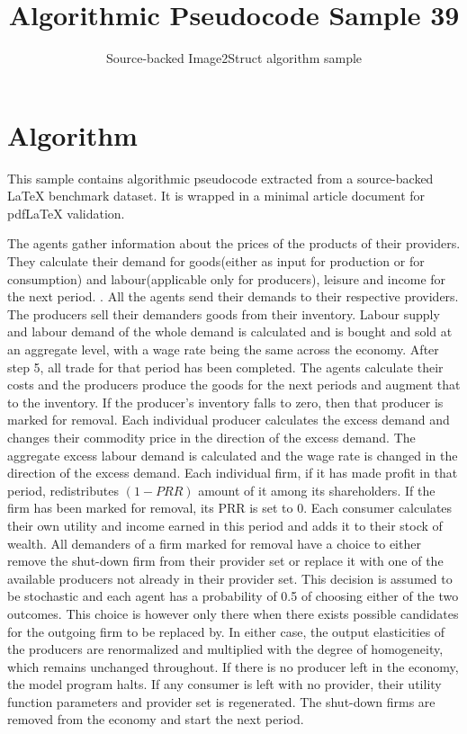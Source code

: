 \documentclass[11pt]{article}
\title{Algorithmic Pseudocode Sample 39}
\author{Source-backed Image2Struct algorithm sample}
\date{}
\begin{document}
\maketitle
\section{Algorithm}
This sample contains algorithmic pseudocode extracted from a source-backed LaTeX benchmark dataset. It is wrapped in a minimal article document for pdfLaTeX validation.

\begin{algorithm}[htbp]
\caption{Source-backed algorithmic procedure}
\begin{algorithm}
\caption{Agent action procedure for each period}\begin{algorithmic}[1]
\State The agents gather information about the prices of the products of their providers.
\State They calculate their demand for goods(either as input for production or for consumption) and labour(applicable only for producers), leisure and income for the next period. .
\State All the agents send their demands to their respective providers.
\State The producers sell their demanders goods from their inventory.
\State Labour supply and labour demand of the whole demand is calculated and is bought and sold at an aggregate level, with a wage rate being the same across the economy.
\State After step 5, all trade for that period has been completed. The agents calculate their costs and the producers produce the goods for the next periods and augment that to the inventory. If the producer's inventory falls to zero, then that producer is marked for removal.
\State Each individual producer calculates the excess demand and changes their commodity price in the direction of the excess demand.
\State The aggregate excess labour demand is calculated and the wage rate is changed in the direction of the excess demand.
\State Each individual firm, if it has made profit in that period, redistributes $(1-PRR)$ amount of it among its shareholders. If the firm has been marked for removal, its PRR is set to 0.
\State Each consumer calculates their own utility and income earned in this period and adds it to their stock of wealth.
\State All demanders of a firm marked for removal have a choice to either remove the shut-down firm from their provider set or replace it with one of the available producers not already in their provider set. This decision is assumed to be stochastic and each agent has a probability of 0.5 of choosing either of the two outcomes. This choice is however only there when there exists possible candidates for the outgoing firm to be replaced by. In either case, the output elasticities of the producers are renormalized and multiplied with the degree of homogeneity, which remains unchanged throughout. If there is no producer left in the economy, the model program halts.
\State If any consumer is left with no provider, their utility function parameters and provider set is regenerated.
\State The shut-down firms are removed from the economy and start the next period.
\end{algorithmic}
\end{algorithm}
\end{algorithm}
\end{document}
